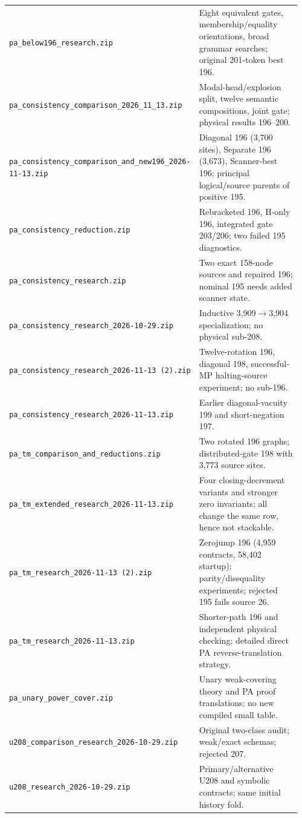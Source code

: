 \begin{longtable}{@{}>{\raggedright\arraybackslash}p{0.45\linewidth}>{\raggedright\arraybackslash}p{0.51\linewidth}@{}}
\nolinkurl{pa_below196_research.zip} & Eight equivalent gates, membership/equality orientations, broad grammar searches; original 201-token best 196.\\[3pt]
\nolinkurl{pa_consistency_comparison_2026_11_13.zip} & Modal-head/explosion split, twelve semantic compositions, joint gate; physical results 196--200.\\[3pt]
\nolinkurl{pa_consistency_comparison_and_new196_2026-11-13.zip} & Diagonal 196 (3,700 sites), Separate 196 (3,673), Scanner-best 196; principal logical/source parents of positive 195.\\[3pt]
\nolinkurl{pa_consistency_reduction.zip} & Rebracketed 196, H-only 196, integrated gate 203/206; two failed 195 diagnostics.\\[3pt]
\nolinkurl{pa_consistency_research.zip} & Two exact 158-node sources and repaired 196; nominal 195 needs added scanner state.\\[3pt]
\nolinkurl{pa_consistency_research_2026-10-29.zip} & Inductive 3,909$\to$3,904 specialization; no physical sub-208.\\[3pt]
\nolinkurl{pa_consistency_research_2026-11-13 (2).zip} & Twelve-rotation 196, diagonal 198, successful-MP halting-source experiment; no sub-196.\\[3pt]
\nolinkurl{pa_consistency_research_2026-11-13.zip} & Earlier diagonal-vacuity 199 and short-negation 197.\\[3pt]
\nolinkurl{pa_tm_comparison_and_reductions.zip} & Two rotated 196 graphs; distributed-gate 198 with 3,773 source sites.\\[3pt]
\nolinkurl{pa_tm_extended_research_2026-11-13.zip} & Four closing-decrement variants and stronger zero invariants; all change the same row, hence not stackable.\\[3pt]
\nolinkurl{pa_tm_research_2026-11-13 (2).zip} & Zerojump 196 (4,959 contracts, 58,402 startup); parity/disequality experiments; rejected 195 fails source 26.\\[3pt]
\nolinkurl{pa_tm_research_2026-11-13.zip} & Shorter-path 196 and independent physical checking; detailed direct PA reverse-translation strategy.\\[3pt]
\nolinkurl{pa_unary_power_cover.zip} & Unary weak-covering theory and PA proof translations; no new compiled small table.\\[3pt]
\nolinkurl{u208_comparison_research_2026-10-29.zip} & Original two-class audit; weak/exact schemas; rejected 207.\\[3pt]
\nolinkurl{u208_research_2026-10-29.zip} & Primary/alternative U208 and symbolic contracts; same initial history fold.\\[3pt]

\end{longtable}
